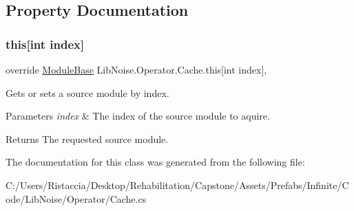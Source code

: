\subsection{Property Documentation}
\mbox{\label{class_lib_noise_1_1_operator_1_1_cache_abc7b67db7bbe4b93fcf733a2e9b4555a}} 
\subsubsection{\texorpdfstring{this[int index]}{this[int index]}}
{\footnotesize\ttfamily override \hyperlink{class_lib_noise_1_1_module_base}{Module\+Base} Lib\+Noise.\+Operator.\+Cache.\+this\mbox{[}int index\mbox{]}\hspace{0.3cm}{\ttfamily [get]}, {\ttfamily [set]}}



Gets or sets a source module by index. 


\begin{DoxyParams}{Parameters}
{\em index} & The index of the source module to aquire.\\
\hline
\end{DoxyParams}
\begin{DoxyReturn}{Returns}
The requested source module.
\end{DoxyReturn}


The documentation for this class was generated from the following file\+:\begin{DoxyCompactItemize}
\item 
C\+:/\+Users/\+Ristaccia/\+Desktop/\+Rehabilitation/\+Capstone/\+Assets/\+Prefabs/\+Infinite/\+Code/\+Lib\+Noise/\+Operator/Cache.\+cs\end{DoxyCompactItemize}
